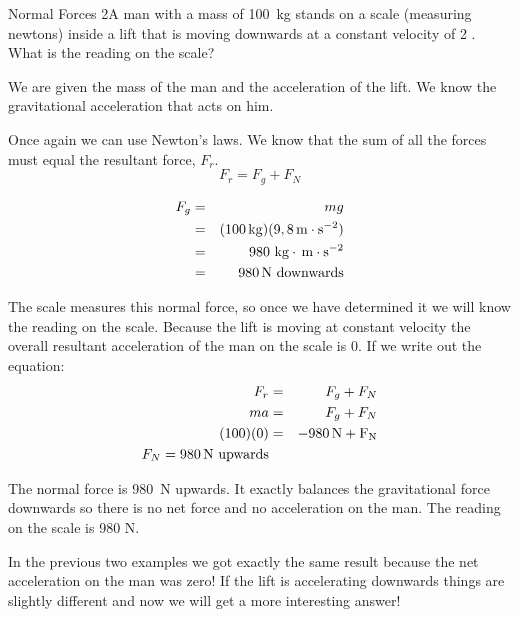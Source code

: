 \begin{wex}{Normal Forces 2}{A man with a mass of 100~kg stands on a scale (measuring newtons) inside a lift that is moving downwards at a constant velocity of 2 \ms. What is the reading on the scale?}{
We are given the mass of the man and the acceleration of the lift. We know the gravitational acceleration that acts on him.

Once again we can use Newton's laws. We know that the sum of all the forces must equal the resultant force, $F_r$.
\begin{equation*}
F_r=F_g+F_N
\end{equation*}

\begin{eqnarray*}
F_g&=&mg \\
&=& (100\,\mathrm{kg})(9,8\,\mathrm{m \cdot s^{-2}})\\
&=& 980\ \mathrm{kg\cdot\,\mathrm{m \cdot s^{-2}}} \\
&=& 980\,\rm{N}\ \mathrm{downwards}
\end{eqnarray*}

The scale measures this normal force, so once we have determined it we will know the reading on the scale. Because the lift is moving at constant velocity the overall resultant acceleration of the man on the scale is $0$. If we write out the equation:
\begin{eqnarray*}
F_r&=&F_g+F_N \\
ma&=&F_g+F_N \\
(100)(0) &=& -980\,\rm{N} +F_N\\
F_N = 980\,\rm{N}\ \mathrm{upwards}
\end{eqnarray*}

The normal force is 980~N upwards. It exactly balances the gravitational force downwards so there is no net force and no acceleration on the man. The reading on the scale is 980 N.}
\end{wex}

In the previous two examples we got exactly the same result because the net acceleration on the man was zero! If the lift is accelerating downwards things are slightly different and now we will get a more interesting answer!

